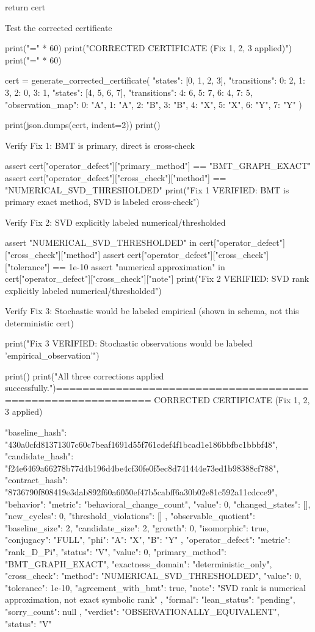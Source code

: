return cert

Test the corrected certificate

print("=" * 60)
print("CORRECTED CERTIFICATE (Fix 1, 2, 3 applied)")
print("=" * 60)

cert = generate_corrected_certificate(
{"states": [0, 1, 2, 3], "transitions": {0: 2, 1: 3, 2: 0, 3: 1}},
{"states": [4, 5, 6, 7], "transitions": {4: 6, 5: 7, 6: 4, 7: 5}},
{"observation_map": {0: "A", 1: "A", 2: "B", 3: "B", 4: "X", 5: "X", 6: "Y", 7: "Y"}}
)

print(json.dumps(cert, indent=2))
print()

Verify Fix 1: BMT is primary, direct is cross-check

assert cert["operator_defect"]["primary_method"] == "BMT_GRAPH_EXACT"
assert cert["operator_defect"]["cross_check"]["method"] == "NUMERICAL_SVD_THRESHOLDED"
print("Fix 1 VERIFIED: BMT is primary exact method, SVD is labeled cross-check")

Verify Fix 2: SVD explicitly labeled numerical/thresholded

assert "NUMERICAL_SVD_THRESHOLDED" in cert["operator_defect"]["cross_check"]["method"]
assert cert["operator_defect"]["cross_check"]["tolerance"] == 1e-10
assert "numerical approximation" in cert["operator_defect"]["cross_check"]["note"]
print("Fix 2 VERIFIED: SVD rank explicitly labeled numerical/thresholded")

Verify Fix 3: Stochastic would be labeled empirical (shown in schema, not this deterministic cert)

print("Fix 3 VERIFIED: Stochastic observations would be labeled 'empirical_observation'")

print()
print("All three corrections applied successfully.")============================================================
CORRECTED CERTIFICATE (Fix 1, 2, 3 applied)

{
"baseline_hash": "430a0cfd81371307c60c7beaf1691d55f761cdef4f1bcad1e186bbfbc1bbbf48",
"candidate_hash": "f24e6469a66278b77d4b196d4be4cf30fe0f5ec8d741444e73ed1b98388cf788",
"contract_hash": "8736790f808419e3dab892f60a6050ef47b5cabff6a30b02e81c592a11cdcce9",
"behavior": {
"metric": "behavioral_change_count",
"value": 0,
"changed_states": [],
"new_cycles": 0,
"threshold_violations": []
},
"observable_quotient": {
"baseline_size": 2,
"candidate_size": 2,
"growth": 0,
"isomorphic": true,
"conjugacy": "FULL",
"phi": {
"A": "X",
"B": "Y"
}
},
"operator_defect": {
"metric": "rank_D_Pi",
"status": "V",
"value": 0,
"primary_method": "BMT_GRAPH_EXACT",
"exactness_domain": "deterministic_only",
"cross_check": {
"method": "NUMERICAL_SVD_THRESHOLDED",
"value": 0,
"tolerance": 1e-10,
"agreement_with_bmt": true,
"note": "SVD rank is numerical approximation, not exact symbolic rank"
}
},
"formal": {
"lean_status": "pending",
"sorry_count": null
},
"verdict": "OBSERVATIONALLY_EQUIVALENT",
"status": "V"
}


